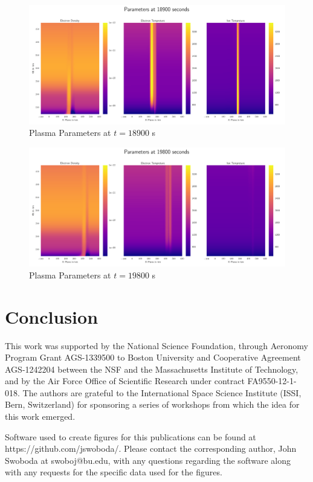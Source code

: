 \documentclass[draft,ras]{agutex}
\begin{document}
\begin{article}
\begin{figure}[!t]
\centering
\includegraphics[width=5in]{060_inputdata}
\caption{Plasma Parameters at $t=18900$ s}
\label{fig:plparamst60}
\end{figure}


\begin{figure}[!t]
\centering
\includegraphics[width=5in]{120_inputdata}
\caption{Plasma Parameters at $t=19800$ s}
\label{fig:plparamst120}
\end{figure}



\section{Conclusion}


\begin{acknowledgments}
This work was supported by the National Science Foundation, through Aeronomy Program Grant AGS-1339500 to Boston University and Cooperative Agreement AGS-1242204 between the NSF and the Massachusetts Institute of Technology, and by the Air Force Office of Scientific Research under contract FA9550-12-1-018.   The authors are grateful to the International Space Science Institute (ISSI, Bern, Switzerland) for sponsoring a series of workshops from which the idea for this work emerged. 

Software used to create figures for this publications can be found at https://github.com/jswoboda/. Please contact the corresponding author, John Swoboda at swoboj@bu.edu, with any questions regarding the software along with any requests for the specific data used for the figures. \end{acknowledgments}




\end{article}
\end{document}
